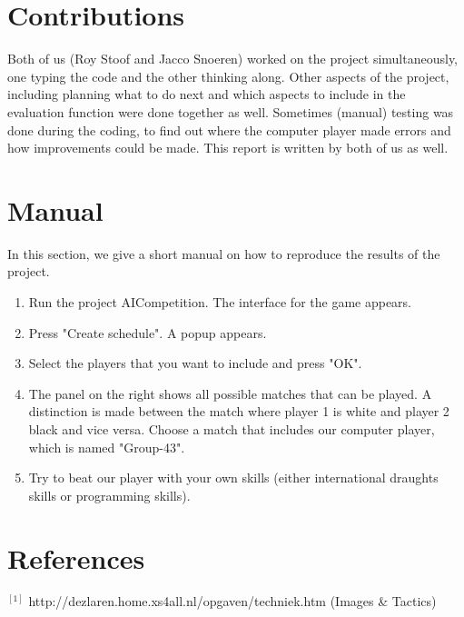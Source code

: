 \documentclass[10pt,a4paper]{article}
\begin{document}
\section{Contributions}
Both of us (Roy Stoof and Jacco Snoeren) worked on the project simultaneously, one typing the code and the other thinking along. Other aspects of the project, including planning what to do next and which aspects to include in the evaluation function were done together as well. Sometimes (manual) testing was done during the coding, to find out where the computer player made errors and how improvements could be made. This report is written by both of us as well.

\section{Manual}
In this section, we give a short manual on how to reproduce the results of the project. 

\begin{enumerate}
\item Run the project AICompetition. The interface for the game appears.
\item Press "Create schedule". A popup appears.
\item Select the players that you want to include and press "OK".
\item The panel on the right shows all possible matches that can be played. A distinction is made between the match where player 1 is white and player 2 black and vice versa. Choose a match that includes our computer player, which is named "Group-43".
\item Try to beat our player with your own skills (either international draughts skills or programming skills). 
\end{enumerate}

\section{References}
$^{[1]}$ http://dezlaren.home.xs4all.nl/opgaven/techniek.htm (Images \& Tactics)
\end{document}

